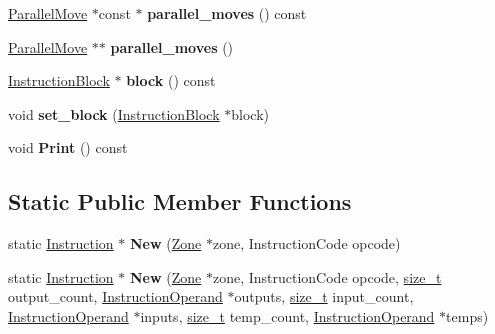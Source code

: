 \begin{DoxyCompactItemize}
\mbox{\hyperlink{classv8_1_1internal_1_1compiler_1_1ParallelMove}{Parallel\+Move}} $\ast$const  $\ast$ {\bfseries parallel\+\_\+moves} () const
\item 
\mbox{\label{classv8_1_1internal_1_1compiler_1_1Instruction_a387dcda3aa7c8025df0473b3a306e3b1}} 
\mbox{\hyperlink{classv8_1_1internal_1_1compiler_1_1ParallelMove}{Parallel\+Move}} $\ast$$\ast$ {\bfseries parallel\+\_\+moves} ()
\item 
\mbox{\label{classv8_1_1internal_1_1compiler_1_1Instruction_a1b77853988e69e23d99a1d56ed2ab17d}} 
\mbox{\hyperlink{classv8_1_1internal_1_1compiler_1_1InstructionBlock}{Instruction\+Block}} $\ast$ {\bfseries block} () const
\item 
\mbox{\label{classv8_1_1internal_1_1compiler_1_1Instruction_aefa319cc23338ef774a5001824189208}} 
void {\bfseries set\+\_\+block} (\mbox{\hyperlink{classv8_1_1internal_1_1compiler_1_1InstructionBlock}{Instruction\+Block}} $\ast$block)
\item 
\mbox{\label{classv8_1_1internal_1_1compiler_1_1Instruction_a9e6d51d16c006654aa9b966f213b4704}} 
void {\bfseries Print} () const
\end{DoxyCompactItemize}
\subsection*{Static Public Member Functions}
\begin{DoxyCompactItemize}
\item 
\mbox{\label{classv8_1_1internal_1_1compiler_1_1Instruction_a62ca7574f6fe058cae23d3a3b59866b3}} 
static \mbox{\hyperlink{classv8_1_1internal_1_1compiler_1_1Instruction}{Instruction}} $\ast$ {\bfseries New} (\mbox{\hyperlink{classv8_1_1internal_1_1Zone}{Zone}} $\ast$zone, Instruction\+Code opcode)
\item 
\mbox{\label{classv8_1_1internal_1_1compiler_1_1Instruction_aa1017ec442404b7318ebbba64fa33c8e}} 
static \mbox{\hyperlink{classv8_1_1internal_1_1compiler_1_1Instruction}{Instruction}} $\ast$ {\bfseries New} (\mbox{\hyperlink{classv8_1_1internal_1_1Zone}{Zone}} $\ast$zone, Instruction\+Code opcode, \mbox{\hyperlink{classsize__t}{size\+\_\+t}} output\+\_\+count, \mbox{\hyperlink{classv8_1_1internal_1_1compiler_1_1InstructionOperand}{Instruction\+Operand}} $\ast$outputs, \mbox{\hyperlink{classsize__t}{size\+\_\+t}} input\+\_\+count, \mbox{\hyperlink{classv8_1_1internal_1_1compiler_1_1InstructionOperand}{Instruction\+Operand}} $\ast$inputs, \mbox{\hyperlink{classsize__t}{size\+\_\+t}} temp\+\_\+count, \mbox{\hyperlink{classv8_1_1internal_1_1compiler_1_1InstructionOperand}{Instruction\+Operand}} $\ast$temps)
\end{DoxyCompactItemize}
